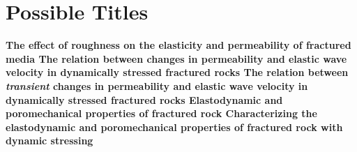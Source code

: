 \documentclass[letterpaper,10pt]{article}
\begin{document}

\section{Possible Titles}
\begin{flushleft}
	\begin{Large}
	\textbf{The effect of roughness on the elasticity and permeability of fractured media
	\linebreak\linebreak\linebreak
	The relation between changes in permeability and elastic wave velocity in dynamically stressed fractured rocks
	\linebreak\linebreak\linebreak
	The relation between \textit{transient} changes in permeability and elastic wave velocity in dynamically stressed fractured rocks
	\linebreak\linebreak\linebreak
	Elastodynamic and poromechanical properties of fractured rock
	\linebreak\linebreak\linebreak
	Characterizing the elastodynamic and poromechanical properties of fractured rock with dynamic stressing}
\end{Large}
\end{flushleft}
\pagebreak
\end{document}
